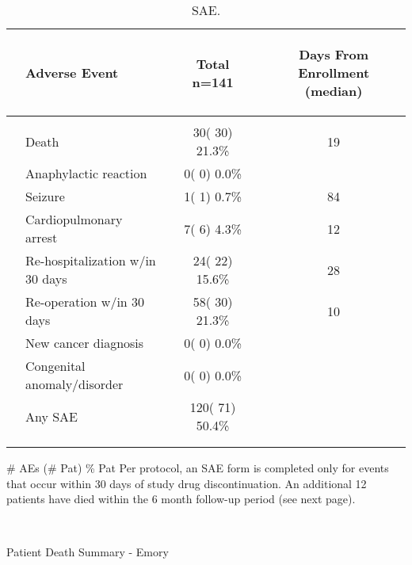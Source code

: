 \documentclass[dvips, 10pt]{article}
\begin{document}
\begin{table}[t]
\caption
{ SAE. }
\begin{center}
\begin{tabular}{ @{}l@{}
@{}l@{}@{}p{1.5em}@{}@{}c@{}@{}p{1.5em}@{}@{}c@{}
}
\hline

& \parbox{6em}{\begin{center}Adverse Event\end{center}} && \parbox{6em}{\begin{center}Total n=141\end{center}} && \parbox{6em}{\begin{center}Days From Enrollment  (median)\end{center}} \\

\hline

\\
& Death && 30( 30) 21.3\% && 19 \\
& Anaphylactic reaction && 0(  0)  0.0\% &&  \\
& Seizure && 1(  1)  0.7\% && 84 \\
& Cardiopulmonary arrest && 7(  6)  4.3\% && 12 \\
& Re-hospitalization w/in 30 days && 24( 22) 15.6\% && 28 \\
& Re-operation w/in 30 days && 58( 30) 21.3\% && 10 \\
& New cancer diagnosis && 0(  0)  0.0\% &&  \\
& Congenital anomaly/disorder && 0(  0)  0.0\% &&  \\
& Any SAE && 120( 71) 50.4\% &&  \\
\\
\hline \\

\end{tabular}


\parbox{ 5in }{ \# AEs (\# Pat) \% Pat \newline Per protocol, an SAE form is completed only for events that occur within 30
  days of study drug discontinuation.  An additional 12 patients have died within
  the 6 month follow-up period (see next page). } \\
 \vspace{1em}\end{center}
 \end{table}

\begin{sidewaystable}
\caption{Patient Death Summary - Emory}
\end{sidewaystable}
\clearpage
\end{document}
